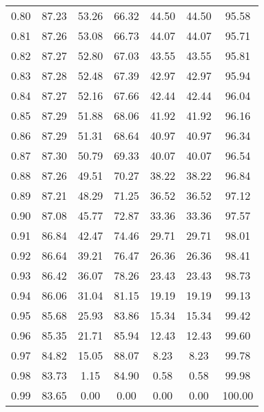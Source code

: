 \begin{tabular}{|c|c|c|c|c|c|c|}
      0.80 &     87.23 &     53.26 &      66.32 &   44.50 &      44.50 &         95.58 \\
      0.81 &     87.26 &     53.08 &      66.73 &   44.07 &      44.07 &         95.71 \\
      0.82 &     87.27 &     52.80 &      67.03 &   43.55 &      43.55 &         95.81 \\
      0.83 &     87.28 &     52.48 &      67.39 &   42.97 &      42.97 &         95.94 \\
      0.84 &     87.27 &     52.16 &      67.66 &   42.44 &      42.44 &         96.04 \\
      0.85 &     87.29 &     51.88 &      68.06 &   41.92 &      41.92 &         96.16 \\
      0.86 &     87.29 &     51.31 &      68.64 &   40.97 &      40.97 &         96.34 \\
      0.87 &     87.30 &     50.79 &      69.33 &   40.07 &      40.07 &         96.54 \\
      0.88 &     87.26 &     49.51 &      70.27 &   38.22 &      38.22 &         96.84 \\
      0.89 &     87.21 &     48.29 &      71.25 &   36.52 &      36.52 &         97.12 \\
      0.90 &     87.08 &     45.77 &      72.87 &   33.36 &      33.36 &         97.57 \\
      0.91 &     86.84 &     42.47 &      74.46 &   29.71 &      29.71 &         98.01 \\
      0.92 &     86.64 &     39.21 &      76.47 &   26.36 &      26.36 &         98.41 \\
      0.93 &     86.42 &     36.07 &      78.26 &   23.43 &      23.43 &         98.73 \\
      0.94 &     86.06 &     31.04 &      81.15 &   19.19 &      19.19 &         99.13 \\
      0.95 &     85.68 &     25.93 &      83.86 &   15.34 &      15.34 &         99.42 \\
      0.96 &     85.35 &     21.71 &      85.94 &   12.43 &      12.43 &         99.60 \\
      0.97 &     84.82 &     15.05 &      88.07 &    8.23 &       8.23 &         99.78 \\
      0.98 &     83.73 &      1.15 &      84.90 &    0.58 &       0.58 &         99.98 \\
      0.99 &     83.65 &      0.00 &       0.00 &    0.00 &       0.00 &        100.00 \\
\bottomrule
\end{tabular}
